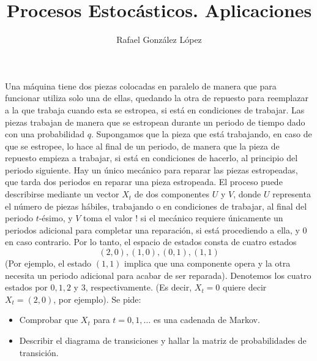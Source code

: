 \documentclass[twoside]{article}
\begin{document}
\title{Procesos Estocásticos. Aplicaciones}
\author{Rafael González López}
\maketitle

\begin{ejercicio}{6}
Una máquina tiene dos piezas colocadas en paralelo de manera que para funcionar utiliza solo una de ellas, quedando la otra de repuesto para reemplazar a la que trabaja cuando esta se estropea, si está en condiciones de trabajar. Las piezas trabajan de manera que se estropean durante un periodo de tiempo dado con una probabilidad $q$. Supongamos que la pieza que está trabajando, en caso de que se estropee, lo hace al final de un periodo, de manera que la pieza de repuesto empieza a trabajar, si está en condiciones de hacerlo, al principio del periodo siguiente. Hay un único mecánico para reparar las piezas estropeadas, que tarda dos periodos en reparar una pieza estropeada. El proceso puede describirse mediante un vector $X_t$ de dos componentes $U$ y $V$, donde $U$ representa el número de piezas hábiles, trabajando o en condiciones de trabajar, al final del periodo $t$-ésimo, y $V$ toma el valor $!$ si el mecánico requiere únicamente un periodos adicional para completar una reparación, si está procediendo a ella, y $0$ en caso contrario. Por lo tanto, el espacio de estados consta de cuatro estados
$$
(2,0), (1,0),(0,1),(1,1)
$$
(Por ejemplo, el estado $(1,1)$ implica que una componente opera y la otra necesita un periodo adicional para acabar de ser reparada). Denotemos los cuatro estados por $0,1,2$ y $3$, respectivamente. (Es decir, $X_t=0$ quiere decir $X_t = (2,0)$, por ejemplo). Se pide:
\begin{itemize}
\item Comprobar que $X_t$ para $t=0,1,\dotsc$ es una cadenada de Markov.
\item Describir el diagrama de transiciones y hallar la matriz de probabilidades de transición.
\end{itemize} 
\end{ejercicio}

\begin{solucion}

\end{solucion}
\end{document}
